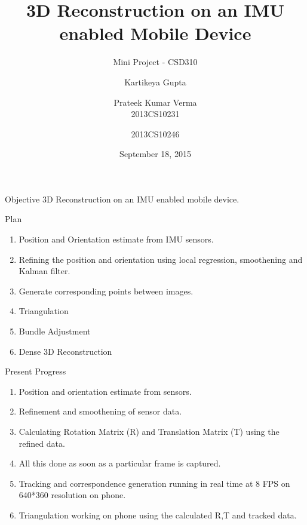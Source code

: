 \documentclass{beamer}
\title[3D reconstruction]{3D Reconstruction on an IMU enabled Mobile Device}
\subtitle{Mini Project - CSD310}
\author[Kartikeya \and Prateek]{\hspace{.063\textwidth} Kartikeya Gupta \and Prateek Kumar Verma \\\small 2013CS10231 \hspace{.1\textwidth} \and \small 2013CS10246}
\institute[IITD] %
{
  Department of Computer Science and Engineering\\
  IIT Delhi
  \and
  Under supervision of \\
  \textbf{Prof. Subhashis Banerjee} \\
  Department of Computer Science and Engineering
}
\date{September 18, 2015}
\begin{document}
\begin{frame}
  \titlepage
\end{frame}

\begin{frame}{Objective}
  3D Reconstruction on an IMU enabled mobile device.

\end{frame}



\begin{frame}{Plan}{}
  \begin{enumerate}
  	\item Position and Orientation estimate from IMU sensors.
  	\item Refining the position and orientation using local regression, smoothening and Kalman filter.
  	\item Generate corresponding points between images.
  	\item Triangulation
  	\item Bundle Adjustment
  	\item Dense 3D Reconstruction
  \end{enumerate}
\end{frame}

\begin{frame}{Present Progress}{}
	\begin{enumerate}
		\item Position and orientation estimate from sensors.
    \item Refinement and smoothening of sensor data. 
    \item Calculating Rotation Matrix (R) and Translation Matrix (T) using the refined data.
    \item All this done as soon as a particular frame is captured.
		\item Tracking and correspondence generation running in real time at 8 FPS on 640*360 resolution on phone.
		\item Triangulation working on phone using the calculated R,T and tracked data.
	\end{enumerate}
\end{frame}
\end{document}
